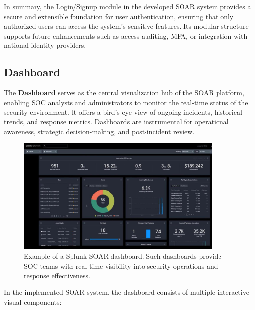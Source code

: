 In summary, the Login/Signup module in the developed SOAR system provides a secure and extensible foundation for user authentication, ensuring that only authorized users can access the system's sensitive features. Its modular structure supports future enhancements such as access auditing, MFA, or integration with national identity providers.

\subsection{Dashboard}

The \textbf{Dashboard} serves as the central visualization hub of the SOAR platform, enabling SOC analysts and administrators to monitor the real-time status of the security environment. It offers a bird’s-eye view of ongoing incidents, historical trends, and response metrics. Dashboards are instrumental for operational awareness, strategic decision-making, and post-incident review.

\begin{figure}[ht]
    \centering
    \includegraphics[width=0.9\textwidth]{images/splunk_soar_dashboard.jpg}
    \caption[Example of a Splunk SOAR dashboard]{Example of a Splunk SOAR dashboard. Such dashboards provide SOC teams with real-time visibility into security operations and response effectiveness.}
    \label{fig:splunk-soar-dashboard}
\end{figure}

In the implemented SOAR system, the dashboard consists of multiple interactive visual components:

